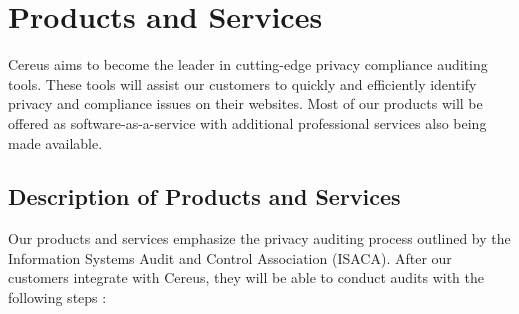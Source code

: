 {\let\cleardoublepage\relax \chapter*{Products and Services}}

Cereus aims to become the leader in cutting-edge privacy compliance auditing tools. These tools will assist our customers to quickly and efficiently identify privacy and compliance issues on their websites. Most of our products will be offered as software-as-a-service with additional professional services also being made available. 

\section{Description of Products and Services} \label{products.services.desc}

Our products and services emphasize the privacy auditing process outlined by the Information Systems Audit and Control Association (ISACA). After our customers integrate with Cereus, they will be able to conduct audits with the following steps \cite{ISACA.2014}:


